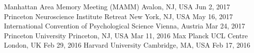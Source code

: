 
\begin{cvhonors}
  \cvdateditem
    {Manhattan Area Memory Meeting (MAMM)}
    {Avalon, NJ, USA}
    {Jun 2, 2017}
  \cvdateditem
    {Princeton Neuroscience Institute Retreat}
    {New York, NJ, USA}
    {May 16, 2017}
  \cvdateditem
    {International Convention of Psychological Science}
    {Vienna, Austria}
    {Mar 24, 2017}
  \cvdateditem
    {Princeton University}
    {Princeton, NJ, USA}
    {Mar 11, 2016}
  \cvdateditem
    {Max Planck UCL Centre}
    {London, UK}
    {Feb 29, 2016}
  \cvdateditem
    {Harvard University}
    {Cambridge, MA, USA}
    {Feb 17, 2016}
\end{cvhonors}